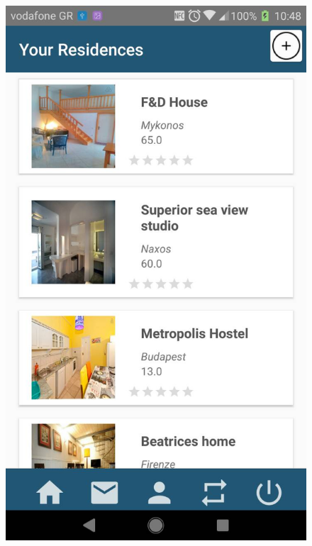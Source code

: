 \documentclass[12pt]{article}
\begin{document}
	\begin{figure} [H]
		\begin{center}
			\includegraphics [scale = 0.18] {22-host.jpg}

\end{center}
\end{figure}
\end{document}
